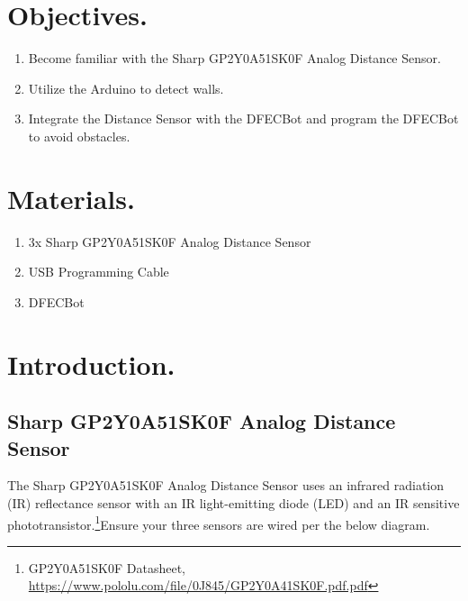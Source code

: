 \documentclass{handout}
\begin{document}
	\maketitle
	
	\section{Objectives.} 
	\begin{enumerate}
		\item Become familiar with the Sharp GP2Y0A51SK0F Analog Distance Sensor.
		\item Utilize the Arduino to detect walls.
		\item Integrate the Distance Sensor with the DFECBot and program the DFECBot to avoid obstacles.
	\end{enumerate}
	
	\section{Materials.}
	\begin{enumerate}
		\item 3x Sharp GP2Y0A51SK0F Analog Distance Sensor
		\item USB Programming Cable
		\item DFECBot
	\end{enumerate}
	
	\section{Introduction.}
	
	\subsection{Sharp GP2Y0A51SK0F Analog Distance Sensor}
	The Sharp GP2Y0A51SK0F Analog Distance Sensor uses an infrared radiation (IR) reflectance sensor with an IR light-emitting diode (LED) and an IR sensitive phototransistor.\footnote{GP2Y0A51SK0F Datasheet, \url{https://www.pololu.com/file/0J845/GP2Y0A41SK0F.pdf.pdf}}Ensure your three sensors are wired per the below diagram.
	
\end{document}
